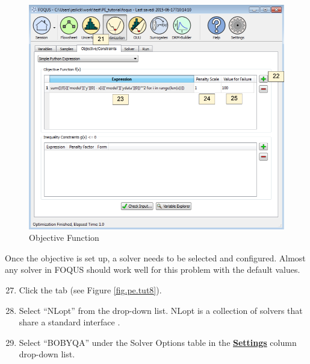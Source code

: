 \begin{figure}[H]
	\begin{center}
		\includegraphics[scale=0.55]{Chapt_optimization/figs/par_est_tut7}
		\caption{Objective Function}
		\label{fig.pe.tut7}
	\end{center}
\end{figure}

Once the objective is set up, a solver needs to be selected and configured. Almost any solver in FOQUS should work well for this problem with the default values.

\begin{enumerate}
	\setcounter{enumi}{26}
	\item Click the  tab (see Figure \ref{fig.pe.tut8}).
	\item Select ``NLopt'' from the  drop-down list. NLopt is a collection of solvers that share a standard interface \citep{Johnson_2015}.
	\item Select ``BOBYQA'' under the Solver Options table in the \textbf{\underline{Settings}} column drop-down list.
\end{enumerate}

